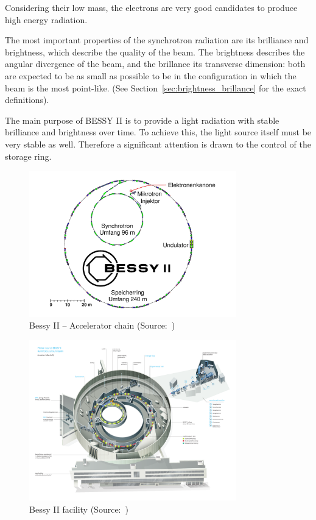 Considering their low mass, the electrons are very good candidates to produce high energy radiation.

The most important properties of the synchrotron radiation are its brilliance and brightness, which describe the quality of the beam. The brightness describes the angular divergence of the beam, and the brillance its transverse dimension: both are expected to be as small as possible to be in the configuration in which the beam is the most point-like. (See Section~\ref{sec:brightness_brillance} for the exact definitions).

The main purpose of BESSY II is to provide a light radiation with stable brilliance and brightness over time. To achieve this, the light source itself must be very stable as well. Therefore a significant attention is drawn to the control of the storage ring.
\begin{figure}
	\centering
	\includegraphics[width=0.8\textwidth]{img/bessy_acc_chain_web.jpg}
	\caption[Bessy II -- Accelerator chain]{\label{fig:bessy_acc_web_simple} Bessy II -- Accelerator chain (Source:~\cite{web:bessy_homepage})}
\end{figure}

\begin{figure}
    \centering
    \includegraphics[width=0.8\textwidth,height=0.8\textheight,keepaspectratio]{img/bessy_acc_web.pdf}
    \caption[Bessy II facility]{\label{fig:bessy_acc_web} Bessy II facility (Source:~\cite{web:bessy_homepage})}
\end{figure}

